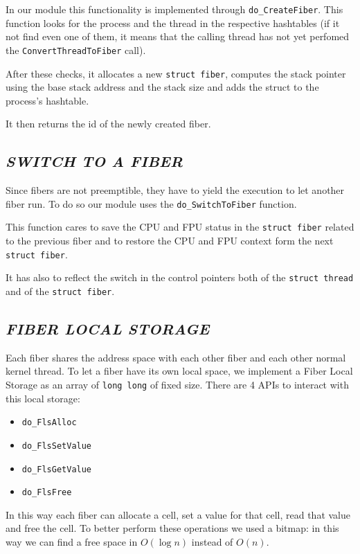 \documentclass[a4paper]{article}
\begin{document}
In our module this functionality is implemented through \texttt{do\_CreateFiber}. This function looks for the process and the thread in the respective hashtables (if it not find even one of them, it means that the calling thread has not yet perfomed the \texttt{ConvertThreadToFiber} call).

After these checks, it allocates a new \texttt{struct fiber}, computes the stack pointer using the base stack address and the stack size and adds the struct to the process's hashtable.

It then returns the id of the newly created fiber.


\subsection*{\textit{SWITCH TO A FIBER}}
Since fibers are not preemptible, they have to yield the execution to let another fiber run. To do so our module uses the \texttt{do\_SwitchToFiber} function.

This function cares to save the CPU and FPU status in the \texttt{struct fiber} related to the previous fiber and to restore the CPU and FPU context form the next \texttt{struct fiber}.

It has also to reflect the switch in the control pointers both of the \texttt{struct thread} and of the \texttt{struct fiber}.

\subsection*{\textit{FIBER LOCAL STORAGE}}
Each fiber shares the address space with each other fiber and each other normal kernel thread. To let a fiber have its own local space, we implement a Fiber Local Storage as an array of \texttt{long long} of fixed size. There are 4 APIs to interact with this local storage:

\begin{itemize}
  \item \texttt{do\_FlsAlloc}
  \item \texttt{do\_FlsSetValue}
  \item \texttt{do\_FlsGetValue}
  \item \texttt{do\_FlsFree}
\end{itemize}

In this way each fiber can allocate a cell, set a value for that cell, read that value and free the cell.
To better perform these operations we used a bitmap: in this way we can find a free space in $O(\log n)$ instead of $O(n)$.
\end{document}
